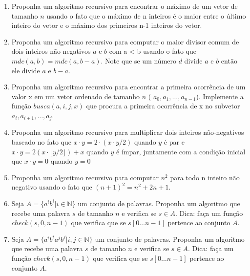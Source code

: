 \begin{enumerate}
    \item Proponha um algoritmo recursivo para encontrar o máximo de um vetor de tamanho $n$ usando o fato que o máximo de n inteiros é o maior entre o último inteiro do vetor e o máximo dos primeiros n-1 inteiros do vetor. 
    
    \item Proponha um algoritmo recursivo para computar o maior divisor comum de dois inteiros não negativos $a$ e $b$ com a  < b usando o fato que $mdc(a,b) = mdc(a, b-a)$. Note que se um número $d$ divide $a$ e $b$ então ele divide $a$ e $b-a$.
    
    \item Proponha um algoritmo recursivo para encontrar a primeira ocorrência de um valor x em um vetor ordenado de tamanho $n$ ( $a_0,a_1, \ldots, a_{n-1}$). Implemente a função $busca(a, i, j, x)$ que procura a primeira ocorrência de x no subvetor $a_i, a_{i+1}, \ldots, a_j$. 
    
    \item Proponha um algoritmo recursivo para multiplicar dois inteiros não-negativos baseado no fato que $x \cdot y = 2 \cdot (x \cdot y/2)$ quando $y$ é par e $x \cdot y = 2( x \cdot \lfloor y / 2 \rfloor) + x$ quando $y$ é ímpar, juntamente com a condição inicial que $x \cdot y = 0$ quando $y = 0$ 
    
    \item Proponha um algoritmo recursivo para computar $n^2$ para todo n inteiro não negativo usando o fato que $(n+1)^2 = n^2 + 2n + 1$.
    
    \item Seja $A = \{a^ib^i| i \in \mathbb{N}\}$ um conjunto de palavras. Proponha um algoritmo que recebe uma palavra $s$ de tamanho $n$ e verifica se $s \in A$. Dica: faça um função $check(s, 0, n-1)$ que verifica que se $s[0\ldots n-1]$ pertence ao conjunto  $A$.
    
    \item Seja $A = \{a^ib^ia^jb^j| i,j \in \mathbb{N}\}$ um conjunto de palavras. Proponha um algoritmo que recebe uma palavra $s$ de tamanho $n$ e verifica se $s \in A$. Dica: faça um função $check(s, 0, n-1)$ que verifica que se $s[0\ldots n-1]$ pertence ao conjunto  $A$.
    
    
    

\end{enumerate}
